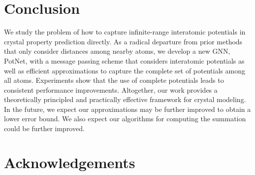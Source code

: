 \documentclass[nohyperref]{article}
\theoremstyle{plain}
\theoremstyle{definition}
\theoremstyle{remark}
\begin{document}
\section{Conclusion}

We study the problem of how to capture infinite-range interatomic potentials in crystal property prediction directly. As a radical departure from prior methods that only consider distances among nearby atoms, we develop a new GNN, PotNet, with a message passing scheme that considers interatomic potentials as well as efficient approximations to capture the complete set of potentials among all atoms. Experiments show that the use of complete potentials leads to consistent performance improvements. Altogether, our work provides a theoretically principled and practically effective framework for crystal modeling. In the future, we expect our approximations may be further improved to obtain a lower error bound. We also expect our algorithms for computing the summation could be further improved.

\section*{Acknowledgements}
\end{document}
